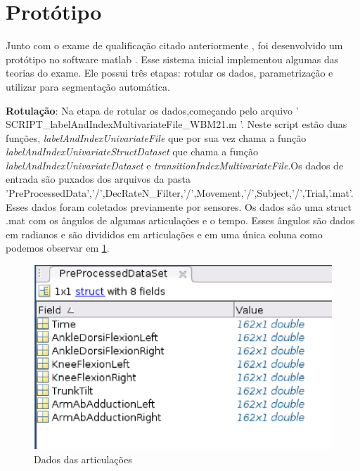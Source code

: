 \section{Protótipo}
\label{Sec:protótipo}
  Junto com o exame de qualificação citado anteriormente \cite{roberto}, foi
desenvolvido um protótipo no software matlab \cite{matlab}. Esse sistema inicial
implementou algumas das teorias do exame. Ele possui três etapas: rotular os dados,
parametrização e utilizar para segmentação automática.
\begin{itemize}

\begin{sloppypar}

\item \textbf{Rotulação}: Na etapa de rotular os dados,começando pelo arquivo
' SCRIPT\_labelAndIndexMultivariateFile\_WBM21.m '. Neste script estão duas funções,
\textit{labelAndIndexUnivariateFile} que por sua vez chama a função
\textit{labelAndIndexUnivariateStructDataset} que chama a função \textit{labelAndIndexUnivariateDataset}
e \textit{transitionIndexMultivariateFile}.Os dados de entrada são puxados dos arquivos da pasta
'PreProcessedData','/',DecRateN\_Filter,'/',Movement,'/',Subject,'/',Trial,'.mat'.
Esses dados foram coletados previamente por sensores. Os dados são uma struct .mat
com  os ângulos de algumas articulações e o tempo. Esses ângulos são dados em radianos
 e são divididos em articulações e em uma única coluna como podemos observar em \ref{structMatlab}.

\begin{figure}[!h]
\centering
\includegraphics [keepaspectratio=true,scale=0.60]{figuras/structMatlab.eps}
\caption{Dados das articulações}
\label{structMatlab}
\end{figure}


\end{sloppypar}
\end{itemize}
